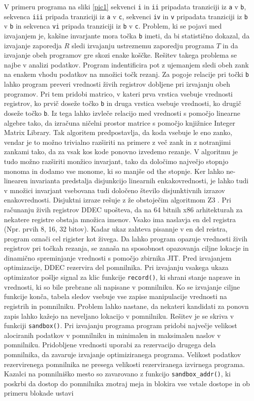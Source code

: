 \documentclass[a4paper, 12pt]{book}
\begin{document}
	V primeru programa na sliki \ref{pic1} sekvenci \texttt{i} in \texttt{ii} pripadata tranziciji iz \texttt{a} v \texttt{b}, sekvenca \texttt{iii} pripada tranziciji iz \texttt{a} v \texttt{c}, sekvenci \texttt{iv} in \texttt{v} pripadata tranziciji iz \texttt{b} v \texttt{b} in sekvenca \texttt{vi} pripada tranziciji iz \texttt{b} v \texttt{c}. Problem, ki se pojavi med izvajanjem je, kakšne invarjante mora točka \texttt{b} imeti, da bi statistično dokazal, da izvajanje zaporedja $R$ sledi izvajanju ustreznemu zaporedju programa $T$ in da izvajanje obeh programov gre skozi enake koščke. Rešitev takega problema se najbe v analizi podatkov. Program indentificira pot z ujemanjem sledi obeh zank na enakem vhodu podatkov na množici točk rezanj. Za pogoje relacije pri točki \texttt{b} lahko program preveri vrednosti živih registrov dobljene pri izvajanju obeh programov. Pri tem pridobi matrico, v kateri prva vrstica vsebuje vrednosti registrov, ko prvič doseže točko \texttt{b} in druga vrstica vsebuje vrednosti, ko drugič doseže točko \texttt{b}. Iz tega lahko izvleče relacijo med vrednosti s pomočjo linearne algebre tako, da izračuna ničelni prostor matrice s pomočjo knjižnice Integer Matrix Library. Tak algoritem predpostavlja, da koda vsebuje le eno zanko, vendar je to možno trivialno razširiti na primere z več zank in z notranjimi zankami tako, da za vsak kos kode ponovno izvedemo rezanje. V algoritmu je tudo možno razširiti monžico invarjant, tako da določimo največjo stopnjo monoma in dodamo vse monome, ki so manjše od the stopnje. Ker lahko ne-linearen invarianta predstalja disjunkcijo linearnih enkakovrednosti, je lahko tudi v množici invarjant vsebovana tudi določeno število disjunktivnih izrazov enakovrednosti. Disjuktni izraze rešuje z že obstoječim algoritmom Z3 \cite{article3}. Pri računanju živih registrov DDEC upošteva, da na 64 bitnih x86 arhitekturah za nekatere registre obstaja množica imenov. Vsako ima naslavja en del registra (Npr. prvih 8, 16, 32 bitov). Kadar ukaz zahteva pisannje v en del reistra, program označi cel rigister kot živega. Da lahko program opazuje vrednosti živih registrov pri točkah rezanja, se zanaša na sposobnost opazovanja ciljne lokacje in dinamično spreminjanje vrednosti s pomočjo zbirnika JIT. Pred izvajanjem optimizacije, DDEC rezervira del pomnilnika. Pri izvajanju vsakega ukaza optimizator pošlje signal za klic funkcije \texttt{record()}, ki shrani stanje naprave in vrednosti, ki so bile prebrane ali napisane v pomnilniku. Ko se izvajanje ciljne funkcije konča, tabela sledov vsebuje vse zapise manipulacije vrednosti na registrih in pomnilniku. Problem lahko nastane, da nekateri kandidati za ponovn zapis lahko kažejo na neveljano lokacijo v pomnilniku. Rešitev je se skriva v funkciji \texttt{sandbox()}. Pri izvajanju programa program pridobi največje velikost alociranih podatkov v pomnilniku in minimalen in maksimalen naslov v pomnilniku. Pridobljene vrednosti uporabi za rezervacijo drugega dela pomnilnika, da zavaruje izvajanje optimiziranega programa. Velikost podatkov rezervirenega pomnilnika ne presega velikosti rezerviranega izvirnega programa. Kazalci na pomnilniško mesto so zavarovano z funkcijo \texttt{sandbox\_addr()}, ki poskrbi da dostop do pomnilnika znotraj meja in blokira vse vstale dostope in ob primeru blokade ustavi 
\end{document}
